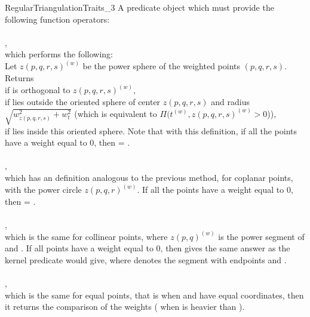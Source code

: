 \begin{ccRefConcept}{RegularTriangulationTraits_3}
{A predicate object which must provide the following function operators:
%
\\
\\
,\\
which performs the following:\\
Let ${z(p,q,r,s)}^{(w)}$ be the power sphere of the weighted points 
$(p,q,r,s)$. Returns \\
 if  is orthogonal to
${z(p,q,r,s)}^{(w)}$,\\ 
 if  lies outside the oriented sphere of
center $z(p,q,r,s)$ and radius $\sqrt{ w_{z(p,q,r,s)}^2 + w_t^2 }$
(which is equivalent to $\Pi({t}^{(w)},{z(p,q,r,s)}^{(w)} >0$)),\\
 if  lies inside this oriented sphere.
%
Note that with this definition, if all the points have a weight equal
to 0, then
 = .
%
%
\\
\\
,\\
which has an
definition analogous to the previous method, for coplanar points,
with the power circle ${z(p,q,r)}^{(w)}$.
%
If all the points have a weight equal to 0, then
 = .
%
\\
\\
,\\
which is the same for collinear points, where ${z(p,q)}^{(w)}$ is the
power segment of  and .
%
If all points have a weight equal to 0, then
 gives the same answer as the kernel predicate
 would give, where   denotes the
segment with endpoints  and .
%
\\
\\
,\\
which is the same for equal points, that is when  and 
have equal coordinates, then it returns the comparison of the weights
( when  is heavier than ).
}


\end{ccRefConcept}
